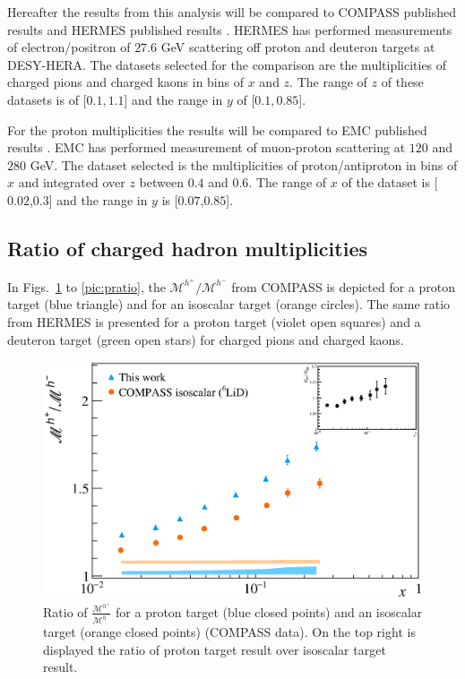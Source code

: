 Hereafter the results from this analysis will be compared to COMPASS published results and HERMES published results \cite{HERMESMult}. HERMES has performed measurements of electron/positron of $27.6$ GeV scattering off proton and deuteron targets at DESY-HERA. The datasets selected for the comparison are the multiplicities of charged pions and charged kaons in bins of $x$ and $z$. The range of $z$ of these datasets is of [$0.1,1.1$] and the range in $y$ of [$0.1,0.85$].

For the proton multiplicities the results will be compared to EMC published results \cite{EMCMult}. EMC has performed measurement of muon-proton scattering at $120$ and $280$ GeV. The dataset selected is the multiplicities of proton/antiproton in bins of $x$ and integrated over $z$ between $0.4$ and $0.6$. The range of $x$ of the dataset is [$0.02$,$0.3$] and the range in $y$ is [$0.07$,$0.85$].

\subsection{Ratio of charged hadron multiplicities}

In Figs.~\ref{pic:hratio} to \ref{pic:pratio}, the $\mathscr{M}^{h^+}/\mathscr{M}^{h^-}$ from COMPASS is depicted for a proton target (blue triangle) and for an isoscalar target (orange circles). The same ratio from HERMES is presented for a proton target (violet open squares) and a deuteron target (green open stars) for charged pions and charged kaons.

\begin{figure}[!h]
  \centering
	\includegraphics[scale=0.5]{./gfx/Mult_h_ratio.eps}
	\caption{Ratio of $\frac{\mathscr{M}^{h^+}}{\mathscr{M}^{h^-}}$ for a proton target (blue closed points) and an isoscalar target (orange closed points) (COMPASS data). On the top right is displayed the ratio of proton target result over isoscalar target result.}
	\label{pic:hratio}
\end{figure}

